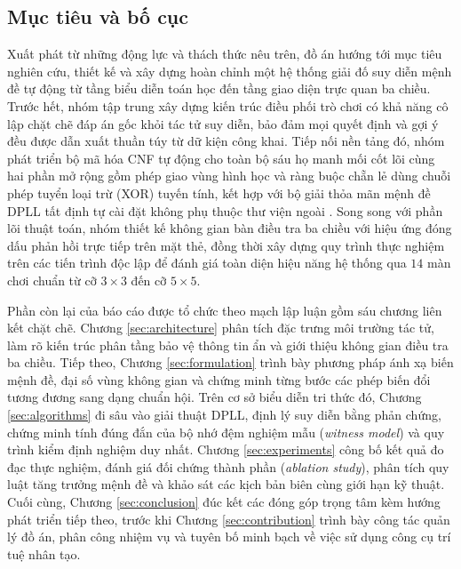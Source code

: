 \subsection{Mục tiêu và bố cục}
Xuất phát từ những động lực và thách thức nêu trên, đồ án hướng tới mục tiêu
nghiên cứu, thiết kế và xây dựng hoàn chỉnh một hệ thống giải đố suy diễn mệnh đề
tự động từ tầng biểu diễn toán học đến tầng giao diện trực quan ba chiều. Trước
hết, nhóm tập trung xây dựng kiến trúc điều phối trò chơi có khả năng cô lập chặt
chẽ đáp án gốc khỏi tác tử suy diễn, bảo đảm mọi quyết định và gợi ý đều được dẫn
xuất thuần túy từ dữ kiện công khai. Tiếp nối nền tảng đó, nhóm phát triển bộ mã
hóa CNF tự động cho toàn bộ sáu họ manh mối cốt lõi cùng hai phần mở rộng gồm
phép giao vùng hình học và ràng buộc chẵn lẻ dùng chuỗi phép tuyển loại trừ (XOR)
tuyến tính, kết hợp với bộ giải thỏa mãn mệnh đề DPLL tất định tự cài đặt không
phụ thuộc thư viện ngoài \cite{davis1960computing,davis1962machine}. Song song
với phần lõi thuật toán, nhóm thiết kế không gian bàn điều tra ba chiều với hiệu
ứng đóng dấu phản hồi trực tiếp trên mặt thẻ, đồng thời xây dựng quy trình thực
nghiệm trên các tiến trình độc lập để đánh giá toàn diện hiệu năng hệ thống qua
$14$ màn chơi chuẩn từ cỡ $3 \times 3$ đến cỡ $5 \times 5$.

Phần còn lại của báo cáo được tổ chức theo mạch lập luận gồm sáu chương liên kết
chặt chẽ. Chương \ref{sec:architecture} phân tích đặc trưng môi trường tác tử,
làm rõ kiến trúc phân tầng bảo vệ thông tin ẩn và giới thiệu không gian điều tra
ba chiều. Tiếp theo, Chương \ref{sec:formulation} trình bày phương pháp ánh xạ
biến mệnh đề, đại số vùng không gian và chứng minh từng bước các phép biến đổi
tương đương sang dạng chuẩn hội. Trên cơ sở biểu diễn tri thức đó, Chương
\ref{sec:algorithms} đi sâu vào giải thuật DPLL, định lý suy diễn bằng phản chứng,
chứng minh tính đúng đắn của bộ nhớ đệm nghiệm mẫu (\textit{witness model}) và
quy trình kiểm định nghiệm duy nhất. Chương \ref{sec:experiments} công
bố kết quả đo đạc thực nghiệm, đánh giá đối chứng thành phần (\textit{ablation
study}), phân tích quy luật tăng trưởng mệnh đề và khảo sát các kịch bản biên
cùng giới hạn kỹ thuật. Cuối cùng, Chương \ref{sec:conclusion} đúc kết các đóng
góp trọng tâm kèm hướng phát triển tiếp theo, trước khi Chương
\ref{sec:contribution} trình bày công tác quản lý đồ án, phân công nhiệm vụ và
tuyên bố minh bạch về việc sử dụng công cụ trí tuệ nhân tạo.

